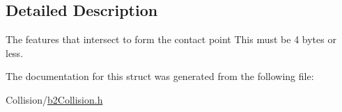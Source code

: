 \subsection{Detailed Description}
The features that intersect to form the contact point This must be 4 bytes or less. 

The documentation for this struct was generated from the following file\+:\begin{DoxyCompactItemize}
\item 
Collision/\mbox{\hyperlink{b2Collision_8h}{b2\+Collision.\+h}}\end{DoxyCompactItemize}
